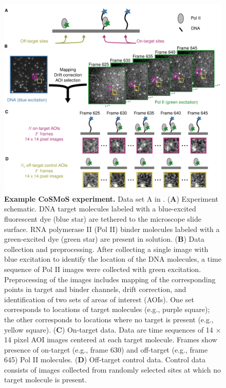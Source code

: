 \begin{figure}
\begin{fullwidth}
\centering
\includegraphics[width=145mm]{figures/cosmos_experiment/cosmos_experiment.png}
\caption{\textbf{Example CoSMoS experiment.} Data set A in . (\textbf{A}) Experiment schematic. DNA target molecules labeled with a blue-excited fluorescent dye (blue star) are tethered to the microscope slide surface. RNA polymerase II (Pol II) binder molecules labeled with a green-excited dye (green star) are present in solution. (\textbf{B}) Data collection and preprocessing. After collecting a single image with blue excitation to identify the location of the DNA molecules, a time sequence of Pol II images were collected with green excitation.  Preprocessing of the images includes mapping of the corresponding points in target and binder channels, drift correction, and identification of two sets of areas of interest (AOIs).  One set corresponds to locations of target molecules (e.g., purple square); the other corresponds to locations where no target is present (e.g., yellow square). (\textbf{C}) On-target data. Data are time sequences of 14 $\times$ 14 pixel AOI images centered at each target molecule. Frames show presence of on-target (e.g., frame 630) and off-target (e.g., frame 645) Pol II molecules. (\textbf{D}) Off-target control data. Control data consists of images collected from randomly selected sites at which no target molecule is present. }
\label{fig:cosmos_experiment}
\end{fullwidth}
\end{figure}